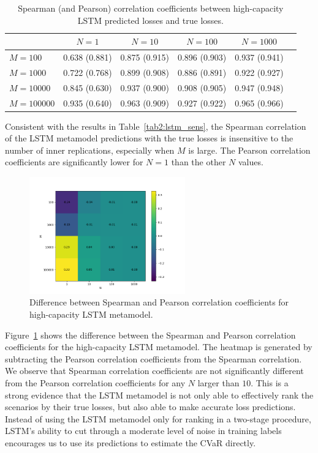 \begin{table}[ht!]
    \small
    \centering
    \begin{tabular}{lccccc}
        \toprule
                          & $N=1$        & $N=10$        & $N=100$       & $N=\num{1000}$ \\
        \midrule
        $M = 100$         & 0.638 (0.881) & 0.875 (0.915) & 0.896 (0.903) & 0.937 (0.941) \\
        $M = \num{1000}$   & 0.722 (0.768) & 0.899 (0.908) & 0.886 (0.891) & 0.922 (0.927) \\
        $M = \num{10000}$  & 0.845 (0.630) & 0.937 (0.900) & 0.908 (0.905) & 0.947 (0.948) \\
        $M = \num{100000}$ & 0.935 (0.640) & 0.963 (0.909) & 0.927 (0.922) & 0.965 (0.966) \\
        \bottomrule
    \end{tabular}
    \caption{Spearman (and Pearson) correlation coefficients between high-capacity LSTM predicted losses and true losses.}
    \label{tab2:lstm_corr}
\end{table}

Consistent with the results in Table~\ref{tab2:lstm_sens}, the Spearman correlation of the LSTM metamodel predictions with the true losses is insensitive to the number of inner replications, especially when $M$ is large.
The Pearson correlation coefficients are significantly lower for $N=1$ than the other $N$ values.

\begin{figure}
    \centering
    \includegraphics[width=0.6\textwidth]{./project2/figures/cor_heatmap.png}
    \caption{Difference between Spearman and Pearson correlation coefficients for high-capacity LSTM metamodel.}
    \label{fig2:cor-heatmap}
\end{figure}

Figure~\ref{fig2:cor-heatmap} shows the difference between the Spearman and Pearson correlation coefficients for the high-capacity LSTM metamodel.
The heatmap is generated by subtracting the Pearson correlation coefficients from the Spearman correlation.
We observe that Spearman correlation coefficients are not significantly different from the Pearson correlation coefficients for any $N$ larger than $10$. 
This is a strong evidence that the LSTM metamodel is not only able to effectively rank the scenarios by their true losses, but also able to make accurate loss predictions.
Instead of using the LSTM metamodel only for ranking in a two-stage procedure, LSTM's ability to cut through a moderate level of noise in training labels encourages us to use its predictions to estimate the CVaR directly. 

